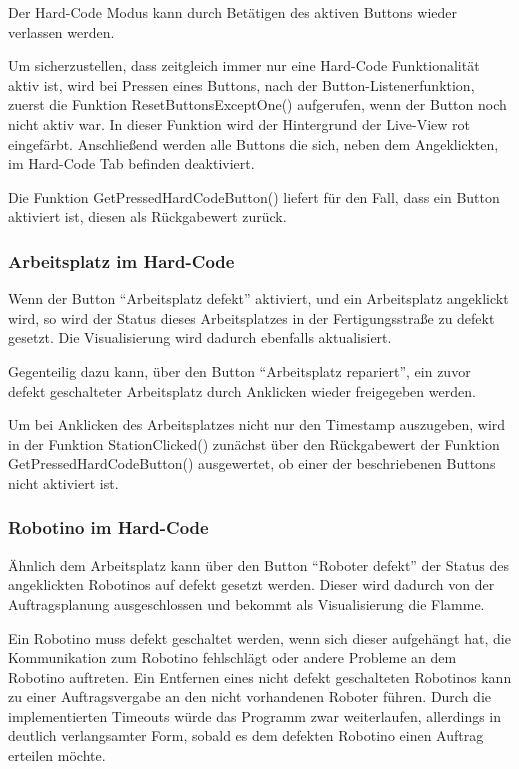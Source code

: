 Der Hard-Code Modus kann durch Betätigen des aktiven Buttons wieder verlassen werden. 

Um sicherzustellen, dass zeitgleich immer nur eine Hard-Code Funktionalität aktiv ist, wird bei Pressen eines Buttons, nach der Button-Listenerfunktion, zuerst die Funktion ResetButtonsExceptOne() aufgerufen, wenn der Button noch nicht aktiv war. In dieser Funktion wird der Hintergrund der Live-View rot eingefärbt. Anschließend werden alle Buttons die sich, neben dem Angeklickten, im Hard-Code Tab befinden deaktiviert. 

Die Funktion GetPressedHardCodeButton() liefert für den Fall, dass ein Button aktiviert ist, diesen als Rückgabewert zurück. 

\subsubsection{Arbeitsplatz im Hard-Code}

Wenn der Button "`Arbeitsplatz defekt"' aktiviert, und ein Arbeitsplatz angeklickt wird, so wird der Status dieses Arbeitsplatzes in der Fertigungsstraße zu defekt gesetzt. Die Visualisierung wird dadurch ebenfalls aktualisiert. 

Gegenteilig dazu kann, über den Button "`Arbeitsplatz repariert"', ein zuvor defekt geschalteter Arbeitsplatz durch Anklicken wieder freigegeben werden. 

Um bei Anklicken des Arbeitsplatzes nicht nur den Timestamp auszugeben, wird in der Funktion StationClicked() zunächst über den Rückgabewert der Funktion GetPressedHardCodeButton() ausgewertet, ob einer der beschriebenen Buttons nicht aktiviert ist. 

\subsubsection{Robotino im Hard-Code}

Ähnlich dem Arbeitsplatz kann über den Button "`Roboter defekt"' der Status des angeklickten Robotinos auf defekt gesetzt werden. Dieser wird dadurch von der Auftragsplanung ausgeschlossen und bekommt als Visualisierung die Flamme. 

Ein Robotino muss defekt geschaltet werden, wenn sich dieser aufgehängt hat, die Kommunikation zum Robotino fehlschlägt oder andere Probleme an dem Robotino auftreten. Ein Entfernen eines nicht defekt geschalteten Robotinos kann zu einer Auftragsvergabe an den nicht vorhandenen Roboter führen. Durch die implementierten Timeouts würde das Programm zwar weiterlaufen, allerdings in deutlich verlangsamter Form, sobald es dem defekten Robotino einen Auftrag erteilen möchte. 

